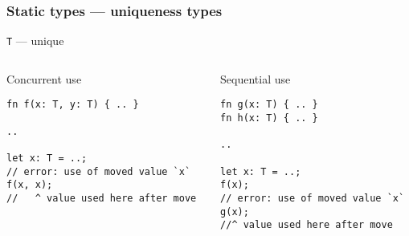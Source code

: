 \documentclass[t]{beamer}
\begin{document}
\begin{frame}[fragile]
\frametitle{Static types --- uniqueness types}

\texttt{T} --- unique
  
\begin{columns}

\begin{column}[T]{0.48\textwidth}
\begin{block}{Concurrent use}
\small
\begin{verbatim}
fn f(x: T, y: T) { .. }

..

let x: T = ..;
// error: use of moved value `x`
f(x, x);
//   ^ value used here after move
\end{verbatim}
\end{block}
\end{column}

\begin{column}[T]{0.48\textwidth}
\begin{block}{Sequential use}
\small
\begin{verbatim}
fn g(x: T) { .. }
fn h(x: T) { .. }

..

let x: T = ..;
f(x);
// error: use of moved value `x`
g(x);
//^ value used here after move
\end{verbatim}
\end{block}
\end{column}

\end{columns}

\end{frame}
\end{document}
